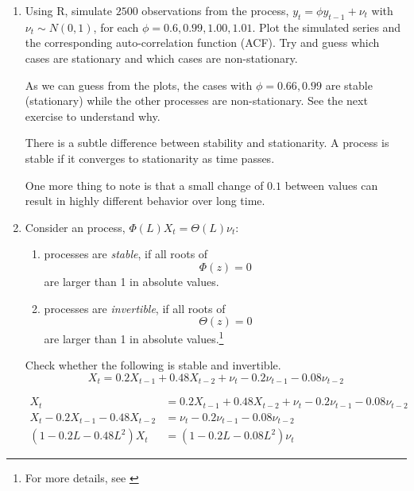 \begin{enumerate}
    \item Using R, simulate $2500$ observations from the \arp[1]{} process, $y_t = \phi y_{t-1} + \nu_t$ with $\nu_t \sim N(0, 1)$, for each $\phi = 0.6, 0.99, 1.00, 1.01$. Plot the simulated series and the corresponding auto-correlation function (ACF). Try and guess which cases are stationary and which cases are non-stationary.

          \begin{sol}
              

              As we can guess from the plots, the cases with $\phi = 0.66, 0.99$ are stable (stationary) while the other processes are non-stationary. See the next exercise to understand why.

              There is a subtle difference between stability and stationarity. A process is stable if it converges to stationarity as time passes.

              One more thing to note is that a small change of $0.1$ between values can result in highly different behavior over long time.
          \end{sol}

    \item Consider an \armapq{} process, $\Phi(L) X_t = \Theta(L) \nu_t$:
          \begin{enumerate}[label=$\bullet$]
              \item \armapq{} processes are \emph{stable}, if all roots of
                    \[ \Phi(z) = 0 \]
                    are larger than 1 in absolute values.

              \item \armapq{} processes are \emph{invertible}, if all roots of
                    \[ \Theta(z) = 0 \]
                    are larger than 1 in absolute values.\footnote{For more details, see \cite[][Chapter 3, "Stationary ARMA Processes"]{Hamilton-1994}}
          \end{enumerate}

          Check whether the following \armapq[2, 2]{} is stable and invertible.
          \[
              X_t
              = 0.2 X_{t-1} + 0.48 X_{t-2}
              + \nu_t - 0.2 \nu_{t-1} - 0.08 \nu_{t-2}
          \]

          \begin{sol}
              \begin{align*}
                  X_t
                   & = 0.2 X_{t-1} + 0.48 X_{t-2}
                  + \nu_t - 0.2 \nu_{t-1} - 0.08 \nu_{t-2}
                  \\
                  X_t - 0.2 X_{t-1} - 0.48 X_{t-2}
                   & = \nu_t - 0.2 \nu_{t-1} - 0.08 \nu_{t-2}
                  \\
                  (1 - 0.2 L - 0.48 L^2) X_t
                   & = (1 - 0.2 L - 0.08 L^2) \nu_t
              \end{align*}


\end{sol}
\end{enumerate}
